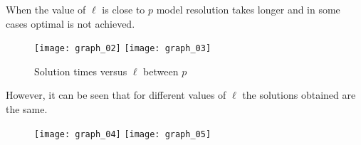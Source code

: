 When the value of $\ell$ 
is close to $p$
model resolution takes longer
and in some cases
optimal is not achieved.
\begin{figure}[!ht]
  \centering
  \texttt{[image: graph\_02]}
  \texttt{[image: graph\_03]}
  \caption{Solution times versus $\ell$ between $p$}
\end{figure}

However,
it can be seen
that for different values of $\ell$
the solutions obtained are the same.

\begin{figure}[!ht]
  \centering
  \texttt{[image: graph\_04]}
  \texttt{[image: graph\_05]}
\end{figure}
